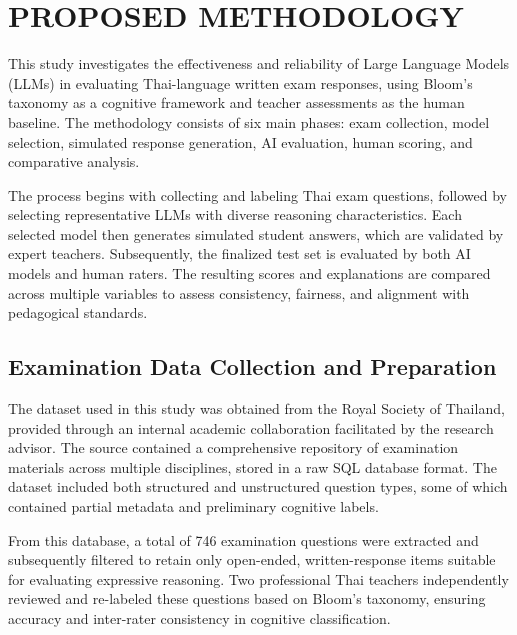 \chapter{PROPOSED METHODOLOGY}
\label{ch:chapter_3}

This study investigates the effectiveness and reliability of 
Large Language Models (LLMs) in evaluating Thai-language 
written exam responses, using Bloom’s taxonomy as a cognitive 
framework and teacher assessments as the human baseline. The 
methodology consists of six main phases: exam collection, 
model selection, simulated response generation, AI evaluation, 
human scoring, and comparative analysis.

The process begins with collecting and labeling Thai exam 
questions, followed by selecting representative LLMs with 
diverse reasoning characteristics. Each selected model then 
generates simulated student answers, which are validated by 
expert teachers. Subsequently, the finalized test set is 
evaluated by both AI models and human raters. The resulting 
scores and explanations are compared across multiple variables 
to assess consistency, fairness, and alignment with pedagogical 
standards.

\section{Examination Data Collection and Preparation}

The dataset used in this study was obtained from the Royal 
Society of Thailand, provided through an internal academic 
collaboration facilitated by the research advisor. The source 
contained a comprehensive repository of examination materials 
across multiple disciplines, stored in a raw SQL database 
format. The dataset included both structured and unstructured 
question types, some of which contained partial metadata and 
preliminary cognitive labels.

From this database, a total of 746 examination questions were 
extracted and subsequently filtered to retain only open-ended, 
written-response items suitable for evaluating expressive 
reasoning. Two professional Thai teachers independently 
reviewed and re-labeled these questions based on Bloom’s 
taxonomy, ensuring accuracy and inter-rater consistency in 
cognitive classification.

